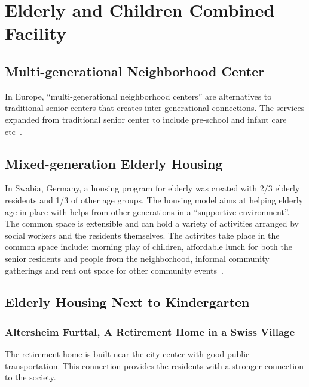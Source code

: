 \section{Elderly and Children Combined Facility}
\subsection{Multi-generational Neighborhood Center}
In Europe, ``multi-generational neighborhood centers''
are alternatives to traditional senior centers that creates
inter-generational connections. The services expanded from traditional
senior center to include pre-school and infant care etc~\cite{Fromm2015}. 

\begin{comment}
\subsubsection{Intergenerational Quartier (Germany)}
The IGZ Quartier urban regeneration project is located in the city of
D{\"u}lmen. The Intergenerational Center of the project aims at ~\cite{Dulmen2014}
\end{comment}
\subsection{Mixed-generation Elderly Housing}
In Swabia, Germany, a housing program for elderly was created with 2/3
elderly residents and 1/3 of other age groups. The housing model aims
at helping elderly age in place with helps from other generations in a
``supportive environment''. The common space is extensible and can
hold a variety of activities arranged by social workers and the
residents themselves. The activites take place in the common space
include: morning play of children, affordable lunch for both the
senior residents and people from the neighborhood, informal community
gatherings and rent out space for other community events~\cite{Fromm2015}.

\subsection{Elderly Housing Next to Kindergarten}
\subsubsection{Altersheim Furttal, A Retirement Home in a Swiss Village}
The retirement home is built near the city center with good public
transportation. This connection provides the residents with a stronger
connection to the society.

